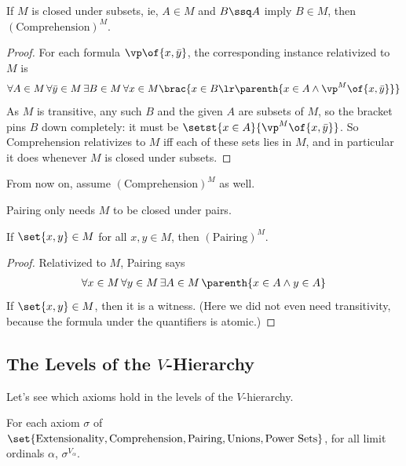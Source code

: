 \begin{boxlemma}[Comprehension]
    If $M$ is closed under subsets, ie, $A \in M$ and $B \ssq A$ imply $B \in M$, then $(\text{Comprehension})^M$.
\end{boxlemma}
\begin{proof} %
    For each formula $\vp\of{x, \bar{y}}$, the corresponding instance relativized to $M$ is
    \begin{align*}
        \forall A \in M \, \forall \bar{y} \in M \, \exists B \in M \, \forall x \in M \brac{x \in B \lr \parenth{x \in A \land \vp^M\of{x, \bar{y}}}}
    \end{align*}
    As $M$ is transitive, any such $B$ and the given $A$ are subsets of $M$, so the bracket pins $B$ down completely: it must be $\setst{x \in A}{\vp^M\of{x, \bar{y}}}$. So Comprehension relativizes to $M$ iff each of these sets lies in $M$, and in particular it does whenever $M$ is closed under subsets.
\end{proof}

From now on, assume $(\text{Comprehension})^M$ as well.

Pairing only needs $M$ to be closed under pairs.

\begin{boxlemma}[Pairing]
    If $\set{x, y} \in M$ for all $x, y \in M$, then $(\text{Pairing})^M$.
\end{boxlemma}
\begin{proof} %
    Relativized to $M$, Pairing says
    \begin{align*}
        \forall x \in M \, \forall y \in M \, \exists A \in M \, \parenth{x \in A \land y \in A}
    \end{align*}
    If $\set{x, y} \in M$, then it is a witness. (Here we did not even need transitivity, because the formula under the quantifiers is atomic.)
\end{proof}

\subsection{The Levels of the $V$-Hierarchy}

Let's see which axioms hold in the levels of the $V$-hierarchy.

\begin{boxproposition}
    For each axiom $\sigma$ of $\set{\text{Extensionality}, \text{Comprehension}, \text{Pairing}, \text{Unions}, \text{Power Sets}}$, for all limit ordinals $\alpha$, $\sigma^{V_{\alpha}}$.
\end{boxproposition}


